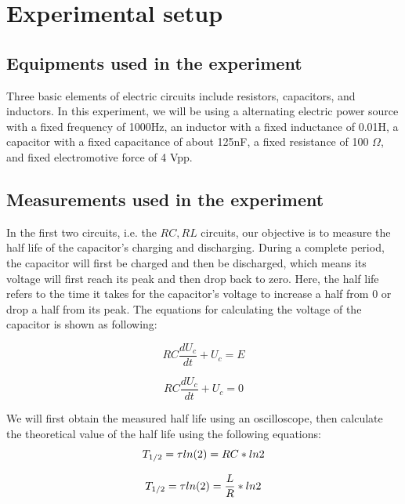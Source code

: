 \documentclass[12pt, a4paper, oneside]{article}
\begin{document}
\section{Experimental setup}
\indent
\subsection{Equipments used in the experiment}
\indent

Three basic elements of electric circuits include resistors, capacitors, and inductors. In this experiment, we will be using a alternating
electric power source with a fixed frequency of 1000Hz, an inductor with a fixed inductance of 0.01H, 
a capacitor with a fixed capacitance of about 125nF, a fixed resistance of 100 $\Omega$, and fixed electromotive force of 4 Vpp. 

\subsection{Measurements used in the experiment}
\indent

In the first two circuits, i.e. the $RC, RL$ circuits, our objective is to measure the half life of the capacitor's charging and 
discharging. During a complete period, the capacitor will first be charged and then be discharged, which means its voltage will first 
reach its peak and then drop back to zero. Here, the half life refers to the time it takes for the capacitor's voltage to increase 
a half from 0 or drop a half from its peak. The equations for calculating the voltage of the capacitor is shown as following:

\begin{equation}
	RC \frac{dU_c}{dt} + U_c = E
\end{equation}

\begin{equation}
	RC \frac{dU_c}{dt} + U_c = 0
\end{equation}

We will first obtain the measured half life using an oscilloscope, then calculate the theoretical value of the half life 
using the following equations:
\begin{equation}
	T_{1/2}=\tau ln(2)=RC*ln2\\
	\label{eq_RC}
\end{equation}

\begin{equation}
	T_{1/2}=\tau ln(2)=\frac{L}{R}*ln2\\
	\label{eq_RL}
\end{equation}
\end{document}
